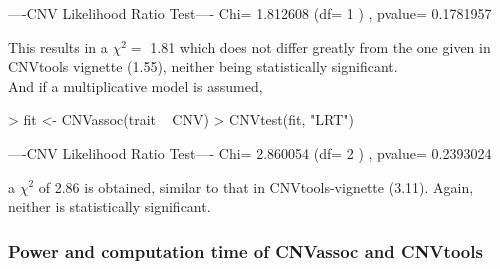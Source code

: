\documentclass[11pt]{article}
\begin{document}
\begin{Schunk}
\begin{Soutput}
----CNV Likelihood Ratio Test----
Chi= 1.812608 (df= 1 ) , pvalue= 0.1781957 
\end{Soutput}
\end{Schunk}


This results in a $\chi^2 =$ 1.81 which does not differ greatly from the one given 
in CNVtools vignette \cite{CNVtools-vignette} (1.55), neither being statistically significant. \\

And if a multiplicative model is assumed, 
\begin{Schunk}
\begin{Sinput}
> fit <- CNVassoc(trait ~ CNV)
> CNVtest(fit, "LRT")
\end{Sinput}
\begin{Soutput}
----CNV Likelihood Ratio Test----
Chi= 2.860054 (df= 2 ) , pvalue= 0.2393024 
\end{Soutput}
\end{Schunk}


\noindent a $\chi^2$ of 2.86 is obtained, similar to that in CNVtools-vignette \cite{CNVtools-vignette} 
(3.11). Again, neither is statistically significant.


\subsubsection{Power and computation time of CNVassoc and CNVtools}
\end{document}
